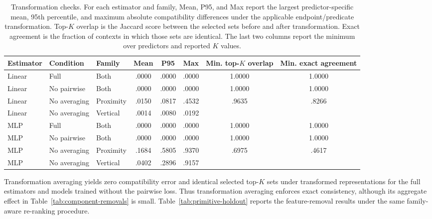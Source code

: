 \begin{table}[t]
\centering
{\small
\setlength{\tabcolsep}{3pt}
\begin{tabular}{lllccccc}
\toprule
Estimator & Condition & Family & Mean & P95 & Max &
Min. top-\(K\) overlap & Min. exact agreement \\
\midrule
Linear & Full & Both & .0000 & .0000 & .0000 & 1.0000 & 1.0000 \\
Linear & No pairwise & Both & .0000 & .0000 & .0000 & 1.0000 & 1.0000 \\
Linear & No averaging & Proximity & .0150 & .0817 & .4532 &
\multirow{2}{*}{.9635} & \multirow{2}{*}{.8266} \\
Linear & No averaging & Vertical & .0014 & .0080 & .0192 & & \\
\midrule
MLP & Full & Both & .0000 & .0000 & .0000 & 1.0000 & 1.0000 \\
MLP & No pairwise & Both & .0000 & .0000 & .0000 & 1.0000 & 1.0000 \\
MLP & No averaging & Proximity & .1684 & .5805 & .9370 &
\multirow{2}{*}{.6975} & \multirow{2}{*}{.4617} \\
MLP & No averaging & Vertical & .0402 & .2896 & .9157 & & \\
\bottomrule
\end{tabular}
}
\caption{Transformation checks. For each estimator and family, Mean, P95, and Max report the largest predictor-specific mean, 95th percentile, and maximum absolute compatibility differences under the applicable endpoint/predicate transformation. Top-\(K\) overlap is the Jaccard score between the selected sets before and after transformation. Exact agreement is the fraction of contexts in which those sets are identical. The last two columns report the minimum over predictors and reported $K$ values.}
\label{tab:transformation-diagnostics}
\end{table}

Transformation averaging yields zero compatibility error and identical selected top-\(K\) sets under transformed representations for the full estimators and models trained without the pairwise loss. Thus transformation averaging enforces exact consistency, although its aggregate effect in Table~\ref{tab:component-removals} is small. Table~\ref{tab:primitive-holdout} reports the feature-removal results under the same family-aware re-ranking procedure.

